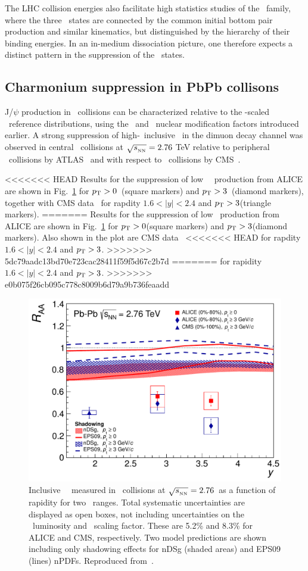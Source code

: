 The LHC collision energies also facilitate high statistics studies of the \PgU\ family, where
the three \PgUn\ states are connected by the common initial bottom pair production and
similar kinematics, but distinguished by the hierarchy of their binding energies. In an
in-medium dissociation picture, one therefore expects a distinct pattern in the suppression
of the \PgUn\ states.

\subsection{Charmonium suppression in PbPb collisons}

J/$\psi$ production in \PbPb\ collisions can be characterized relative to the \Ncoll-scaled \pp\ reference
distributions, using the \Rcp\ and \Raa\ nuclear modification factors introduced earlier.
A strong suppression of high-\pT\ inclusive \jpsi\ in the dimuon decay channel was observed in central \PbPb\ collisions
at $\sqrt{s_{_{\rm NN}}} = 2.76$ TeV  relative to peripheral \PbPb\ collisions by ATLAS~\cite{Aad:2010aa} 
and with respect to \pp\ collisions by CMS~\cite{Chatrchyan:2012np}.

<<<<<<< HEAD
Results for the suppression of low \pT\ \jpsi\ production from ALICE are shown 
in Fig.~\ref{fig:GR:raavsy} for $\mbox{$p_{\mathrm{T}}$} > 0$\GeVc\ (square markers) and 
$\mbox{$p_{\mathrm{T}}$} > 3$\GeVc\ (diamond markers), together with CMS data~\cite{Chatrchyan:2012np} 
for rapdity $ 1.6 < |y| < 2.4 $ and $\mbox{$p_{\mathrm{T}}$} > 3$\GeVc (triangle markers). 
=======
Results for the suppression of low \pT \jpsi\ production from ALICE are shown
in Fig.~\ref{fig:GR:raavsy} for $\mbox{$p_{\mathrm{T}}$} > 0$\GeVc (square markers) and
$\mbox{$p_{\mathrm{T}}$} > 3$\GeVc (diamond markers). Also shown in the plot are CMS data~\cite{Chatrchyan:2012np}
<<<<<<< HEAD
for rapdity $ 1.6 < |y| < 2.4 $ and $\mbox{$p_{\mathrm{T}}$} > 3$\GeVc.
>>>>>>> 5dc79aadc13bd70e723cac28411f59f5d67c2b7d
=======
for rapidity $ 1.6 < |y| < 2.4 $ and $\mbox{$p_{\mathrm{T}}$} > 3$\GeVc.
>>>>>>> e0b075f26cb095c778c8009b6d79a9b736feaadd

\begin{figure}
\begin{center}
\includegraphics[width=0.49\linewidth]{qqbarfigures/RAAvsY_v7-eps-converted-to.pdf}
\caption{ \label{fig:GR:raavsy}  Inclusive \jpsi\ \Raa\ measured in \PbPb\
collisions at $\sqrt{s_{_{\rm NN}}} = 2.76$\TeV\ as a function of  rapidity for two \pT\ ranges.
Total systematic uncertainties are displayed as open boxes, not including
uncertainties on the \pp\ luminosity and \Taa\ scaling factor.  These are
5.2\% and  8.3\% for ALICE and CMS, respectively.
Two model predictions are shown~\cite{Ferreiro:2011rw,Vogt:2010aa} including only shadowing effects
for  nDSg (shaded areas) and EPS09 (lines) nPDFs. Reproduced from~\cite{}.}
\end{center}
\end{figure}

